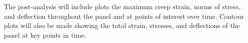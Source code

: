 \documentclass[conf]{new-aiaa}
\begin{document}
\noindent
The post-analysis will include plots the maximum creep strain, norms of stress, 
and deflection throughout the panel and at points of interest over time. 
Contour plots will also be made showing the total strain, stresses, and deflections
of the panel at key points in time.



% 


\end{document}
